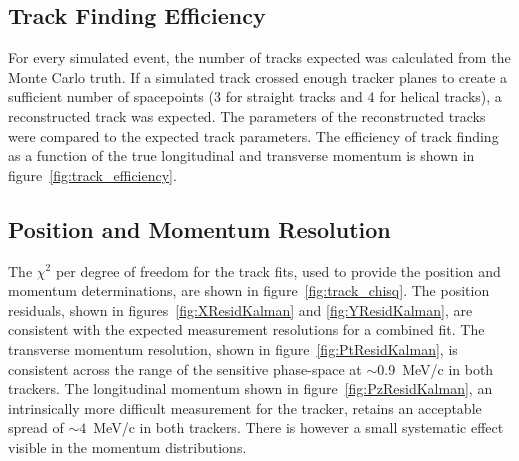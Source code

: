   \subsection{Track Finding Efficiency}
  \label{sec:performance:track_finding}

  For every simulated event, the number of tracks expected was calculated from the Monte Carlo truth. If a simulated track crossed enough tracker planes to create a sufficient number of spacepoints (3 for straight tracks and 4 for helical tracks), a reconstructed track was expected. The parameters of the reconstructed tracks were compared to the expected track parameters. The efficiency of track finding as a function of the true longitudinal and transverse momentum is shown in figure~\ref{fig:track_efficiency}.


  \subsection{Position and Momentum Resolution}
  \label{sec:performance:resolutions}
  
  
  The $\chi^2$ per degree of freedom for the track fits, used to provide the position and momentum determinations, are shown in figure~\ref{fig:track_chisq}. 
  The position residuals, shown in figures~\ref{fig:XResidKalman} and \ref{fig:YResidKalman}, are consistent with the expected measurement resolutions for a combined fit. The transverse momentum resolution, shown in figure~\ref{fig:PtResidKalman}, is consistent across the range of the sensitive phase-space at $\sim$0.9~MeV/c in both trackers. The longitudinal momentum shown in figure~\ref{fig:PzResidKalman}, an intrinsically more difficult measurement for the tracker, retains an acceptable spread of ${\sim4}$~MeV/c in both trackers. There is however a small systematic effect visible in the momentum distributions.

